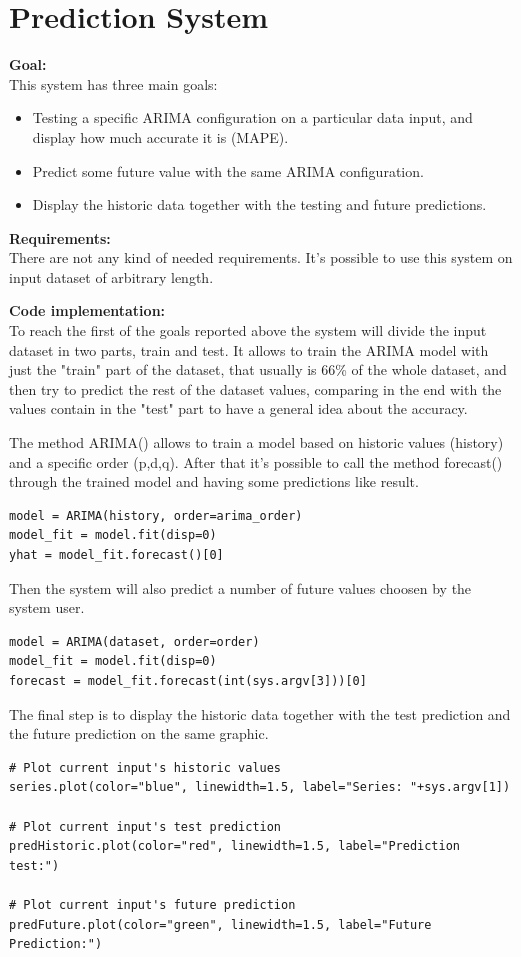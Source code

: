  
 
\newpage
\section{Prediction System}
\textbf{Goal:}\\ 
This system has three main goals:
\vspace{-5mm}
\begin{itemize}
 \setlength{\itemsep}{-5pt} 
\item Testing a specific ARIMA configuration on a particular data input, and display how much accurate it is (MAPE).
\item Predict some future value with the same ARIMA configuration.
\item Display the historic data together with the testing and future predictions.
\end{itemize}

\textbf{Requirements:}\\
There are not any kind of needed requirements. It's possible to use this system on input dataset of arbitrary length.


\textbf{Code implementation:}\\
To reach the first of the goals reported above the system will divide the input dataset in two parts, train and test. It allows to train the ARIMA model with just the "train" part of the dataset, that usually is 66\% of the whole dataset, and then try to predict the rest of the dataset values, comparing in the end with the values contain in the "test" part to have a general idea about the accuracy.

The method ARIMA() allows to train a model based on historic values (history) and a specific order (p,d,q). After that it's possible to call the method forecast() through the trained model and having some predictions like result.

\begin{lstlisting}
model = ARIMA(history, order=arima_order)
model_fit = model.fit(disp=0)
yhat = model_fit.forecast()[0]
\end{lstlisting}

Then the system will also predict a number of future values choosen by the system user.
\begin{lstlisting}
model = ARIMA(dataset, order=order)
model_fit = model.fit(disp=0)
forecast = model_fit.forecast(int(sys.argv[3]))[0]
\end{lstlisting}

The final step is to display the historic data together with the test prediction and the future prediction on the same graphic. 
\begin{lstlisting}
# Plot current input's historic values 
series.plot(color="blue", linewidth=1.5, label="Series: "+sys.argv[1])

# Plot current input's test prediction
predHistoric.plot(color="red", linewidth=1.5, label="Prediction test:")

# Plot current input's future prediction
predFuture.plot(color="green", linewidth=1.5, label="Future Prediction:")

\end{lstlisting}

